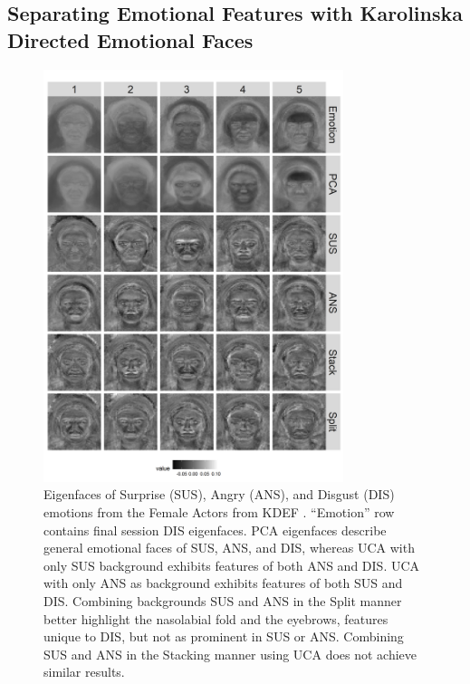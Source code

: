 \documentclass[12pt]{article}
\begin{document}
\subsection{Separating Emotional Features with Karolinska Directed Emotional Faces}
\begin{figure}[!th]
    \centering
	\includegraphics[width = 0.78\textwidth]{figure/F_Surprise_Angry_Disgust_1.png}
    \caption{Eigenfaces of Surprise (SUS), Angry (ANS), and Disgust (DIS) emotions from the Female Actors from KDEF \cite{Calvo2008}. ``Emotion'' row contains final session DIS eigenfaces. PCA eigenfaces describe general emotional faces of SUS, ANS, and DIS, whereas UCA with only SUS background exhibits features of both ANS and DIS. UCA with only ANS as background exhibits features of both SUS and DIS. Combining backgrounds SUS and ANS in the Split manner better highlight the nasolabial fold and the eyebrows, features unique to DIS, but not as prominent in SUS or ANS. Combining SUS and ANS in the Stacking manner using UCA does not achieve similar results.}
	    \label{fig:Faces}
\end{figure}
\end{document}
